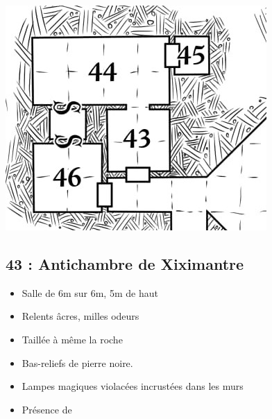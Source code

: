 \vfill
\pagebreak
\includegraphics[width=\columnwidth]{pics/map_43-46.jpg}

\subsection{43 : Antichambre de Xiximantre}\label{n3:s43}
\begin{itemize}
  \item Salle de 6m sur 6m, 5m de haut 
  \item Relents âcres, milles odeurs
  \item Taillée à même la roche
  \item Bas-reliefs de pierre noire.
  \item Lampes magiques violacées incrustées dans les murs
  \item Présence de  \textbf{}
\end{itemize}

\vfill
\pagebreak
